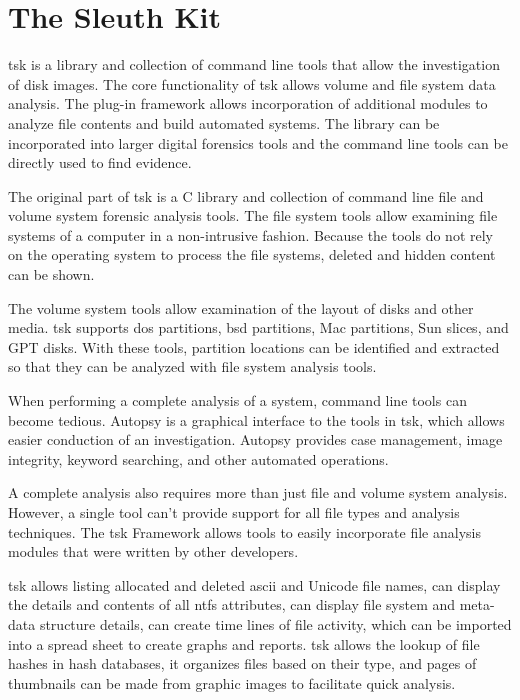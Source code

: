 \section{The Sleuth Kit}

\acrshort{tsk} is a library and collection of command line tools that allow the
investigation of disk images. The core functionality of \acrshort{tsk} allows volume and file system data analysis.
The plug-in framework allows incorporation of additional modules to analyze file contents
and build automated systems. The library can be incorporated into larger digital forensics tools and
the command line tools can be directly used to find evidence.

The original part of \acrshort{tsk} is a C library and collection of command line
file and volume system forensic analysis tools. The file system tools allow examining file systems
of a computer in a non-intrusive fashion. Because the tools do not rely on the operating system to process
the file systems, deleted and hidden content can be shown.

The volume system tools allow examination of the layout of disks
and other media. \acrshort{tsk} supports \acrshort{dos} partitions, \acrshort{bsd} partitions, Mac partitions, Sun slices, and 
GPT disks. With these tools, partition locations can be identified 
and extracted so that they can be analyzed with file system analysis tools.

When performing a complete analysis of a system, command line 
tools can become tedious. Autopsy is a graphical interface to the tools in \acrshort{tsk}, 
which allows easier conduction of an investigation. Autopsy 
provides case management, image integrity, keyword searching, and other automated
operations.

A complete analysis also requires more than just file and volume system analysis.
However, a single tool can't provide support for all file types and analysis 
techniques. The \acrshort{tsk} Framework allows tools to easily incorporate file analysis
modules that were written by other developers.

\acrshort{tsk} allows listing allocated and deleted \acrshort{ascii} and Unicode file names, can display the
details and contents of all \acrshort{ntfs} attributes, can display file system and meta-data structure details,
can create time lines of file activity, which can be imported into a spread sheet to create graphs and reports.
\acrshort{tsk} allows the lookup of file hashes in hash databases, it organizes files based on their type, and pages of
thumbnails can be made from graphic images to facilitate quick analysis.

